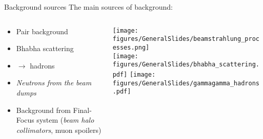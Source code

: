 \begin{frame}{Background sources}
\ilclogo
The main sources of background:
\begin{columns}
 \begin{column}{0.55\textwidth}
  \begin{itemize}
    \item Pair background
    \item Bhabha scattering
    \item \textgamma \textgamma $\rightarrow$ hadrons
    \item \emph{Neutrons from the beam dumps}
    \item Background from Final-Focus system (\emph{beam halo collimators}, muon spoilers)
  \end{itemize}
 \end{column}
 \begin{column}{0.45\textwidth}
 \texttt{[image: figures/GeneralSlides/beamstrahlung\_processes.png]}\\
 \texttt{[image: figures/GeneralSlides/bhabha\_scattering.pdf]} 
 \texttt{[image: figures/GeneralSlides/gammagamma\_hadrons.pdf]}
 \end{column}
\end{columns}

\end{frame}



